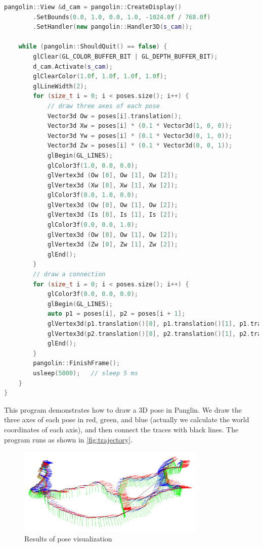 \begin{lstlisting}[language=c++,caption=slambook2/ch3/examples/plotTrajectory.cpp]
    pangolin::View &d_cam = pangolin::CreateDisplay()
        .SetBounds(0.0, 1.0, 0.0, 1.0, -1024.0f / 768.0f)
        .SetHandler(new pangolin::Handler3D(s_cam));
    
    while (pangolin::ShouldQuit() == false) {
        glClear(GL_COLOR_BUFFER_BIT | GL_DEPTH_BUFFER_BIT);
        d_cam.Activate(s_cam);
        glClearColor(1.0f, 1.0f, 1.0f, 1.0f);
        glLineWidth(2);
        for (size_t i = 0; i < poses.size(); i++) {
            // draw three axes of each pose
            Vector3d Ow = poses[i].translation();
            Vector3d Xw = poses[i] * (0.1 * Vector3d(1, 0, 0));
            Vector3d Yw = poses[i] * (0.1 * Vector3d(0, 1, 0));
            Vector3d Zw = poses[i] * (0.1 * Vector3d(0, 0, 1));
            glBegin(GL_LINES);
            glColor3f(1.0, 0.0, 0.0);
            glVertex3d (Ow [0], Ow [1], Ow [2]);
            glVertex3d (Xw [0], Xw [1], Xw [2]);
            glColor3f(0.0, 1.0, 0.0);
            glVertex3d (Ow [0], Ow [1], Ow [2]);
            glVertex3d (Is [0], Is [1], Is [2]);
            glColor3f(0.0, 0.0, 1.0);
            glVertex3d (Ow [0], Ow [1], Ow [2]);
            glVertex3d (Zw [0], Zw [1], Zw [2]);
            glEnd();
        }
        // draw a connection
        for (size_t i = 0; i < poses.size(); i++) {
            glColor3f(0.0, 0.0, 0.0);
            glBegin(GL_LINES);
            auto p1 = poses[i], p2 = poses[i + 1];
            glVertex3d(p1.translation()[0], p1.translation()[1], p1.translation()[2]);
            glVertex3d(p2.translation()[0], p2.translation()[1], p2.translation()[2]);
            glEnd();
        }
        pangolin::FinishFrame();
        usleep(5000);   // sleep 5 ms
    }
}
\end{lstlisting}

This program demonstrates how to draw a 3D pose in Panglin. We draw the three axes of each pose in red, green, and blue (actually we calculate the world coordinates of each axis), and then connect the traces with black lines. The program runs as shown in \autoref {fig:trajectory}.

\begin{figure}[!htp]
    \centering
    \includegraphics[width=0.8\textwidth]{chapter03/rigidMotion/trajectory.pdf}
    \caption {Results of pose visualization}
    \label{fig:trajectory}
\end{figure}

